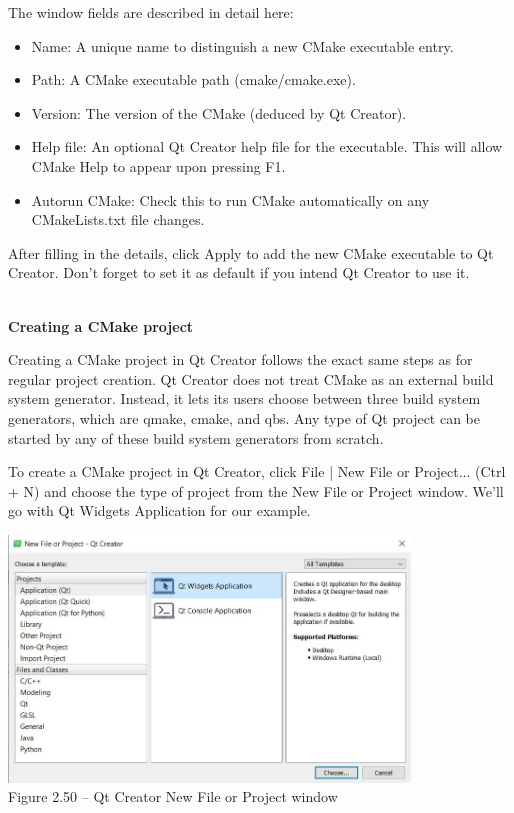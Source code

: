 The window fields are described in detail here:

\begin{itemize}
\item 
Name: A unique name to distinguish a new CMake executable entry.

\item 
Path: A CMake executable path (cmake/cmake.exe).

\item 
Version: The version of the CMake (deduced by Qt Creator).

\item 
Help file: An optional Qt Creator help file for the executable. This will allow CMake Help to appear upon pressing F1.

\item 
Autorun CMake: Check this to run CMake automatically on any CMakeLists.txt file changes.
\end{itemize}

After filling in the details, click Apply to add the new CMake executable to Qt Creator. Don't forget to set it as default if you intend Qt Creator to use it.

\hspace*{\fill} \\ %
\noindent
\textbf{Creating a CMake project}

Creating a CMake project in Qt Creator follows the exact same steps as for regular project creation. Qt Creator does not treat CMake as an external build system generator. Instead, it lets its users choose between three build system generators, which are qmake, cmake, and qbs. Any type of Qt project can be started by any of these build system generators from scratch.

To create a CMake project in Qt Creator, click File | New File or Project... (Ctrl + N) and choose the type of project from the New File or Project window. We'll go with Qt Widgets Application for our example.

\begin{center}
\includegraphics[width=0.8\textwidth]{content/1/chapter2/images/50.jpg}\\
Figure 2.50 – Qt Creator New File or Project window
\end{center}

